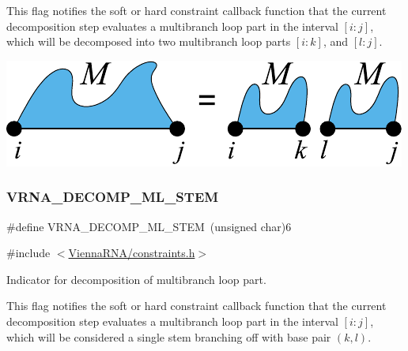 This flag notifies the soft or hard constraint callback function that the current decomposition step evaluates a multibranch loop part in the interval $[i:j]$, which will be decomposed into two multibranch loop parts $[i:k]$, and $[l:j]$.

 
\begin{DoxyImageNoCaption}
  \mbox{\includegraphics[width=\textwidth,height=\textheight/2,keepaspectratio=true]{decomp_ml_ml_ml}}
\end{DoxyImageNoCaption}
 \mbox{\label{group__constraints_ga4a23054c75d8efc785de50e3ea87602f}} 
\subsubsection{\texorpdfstring{V\+R\+N\+A\+\_\+\+D\+E\+C\+O\+M\+P\+\_\+\+M\+L\+\_\+\+S\+T\+EM}{VRNA\_DECOMP\_ML\_STEM}}
{\footnotesize\ttfamily \#define V\+R\+N\+A\+\_\+\+D\+E\+C\+O\+M\+P\+\_\+\+M\+L\+\_\+\+S\+T\+EM~(unsigned char)6}



{\ttfamily \#include $<$\hyperlink{constraints_8h}{Vienna\+R\+N\+A/constraints.\+h}$>$}



Indicator for decomposition of multibranch loop part. 

This flag notifies the soft or hard constraint callback function that the current decomposition step evaluates a multibranch loop part in the interval $[i:j]$, which will be considered a single stem branching off with base pair $(k,l)$.

